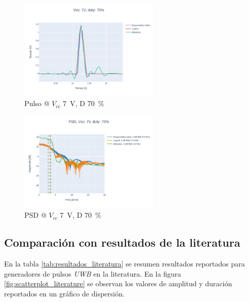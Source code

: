 \begin{figure}
  \centering
    \includegraphics[width=0.6\textwidth]{images/plots/Vcc_7V_duty_70_time_domain.png}
    \caption{Pulso @ $V_{cc}$ \qty{7}{\volt}, D \qty{70}{\percent} }
    \label{fig:plots_7v_70}
\end{figure}

\begin{figure}
  \centering
    \includegraphics[width=0.6\textwidth]{images/plots/Vcc_7V_duty_70_psd.png}
    \caption{PSD @ $V_{cc}$ \qty{7}{\volt}, D \qty{70}{\percent} }
    \label{fig:psd_7v_70}
\end{figure}

\subsection{Comparación con resultados de la literatura}

En la tabla \ref{tab:resultados_literatura} se resumen resultados reportados para generadores de
pulsos \textit{UWB} en la literatura. En la figura \ref{fig:scatterplot_literature} se observan
los valores de amplitud y duración reportados en un gráfico de dispersión.

